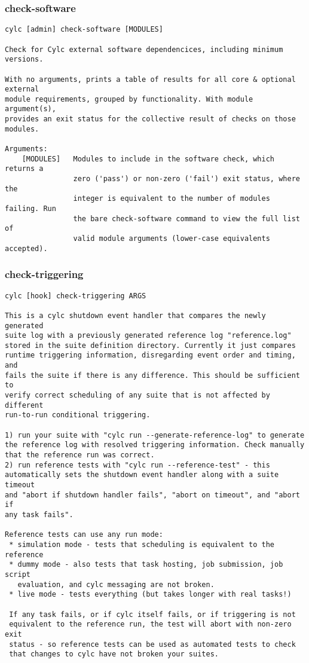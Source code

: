 \subsubsection{check-software}
\label{check-software}
\begin{lstlisting}
cylc [admin] check-software [MODULES]

Check for Cylc external software dependencices, including minimum versions.

With no arguments, prints a table of results for all core & optional external
module requirements, grouped by functionality. With module argument(s),
provides an exit status for the collective result of checks on those modules.

Arguments:
    [MODULES]   Modules to include in the software check, which returns a
                zero ('pass') or non-zero ('fail') exit status, where the
                integer is equivalent to the number of modules failing. Run
                the bare check-software command to view the full list of
                valid module arguments (lower-case equivalents accepted).
\end{lstlisting}
\subsubsection{check-triggering}
\label{check-triggering}
\begin{lstlisting}
cylc [hook] check-triggering ARGS

This is a cylc shutdown event handler that compares the newly generated
suite log with a previously generated reference log "reference.log"
stored in the suite definition directory. Currently it just compares
runtime triggering information, disregarding event order and timing, and
fails the suite if there is any difference. This should be sufficient to
verify correct scheduling of any suite that is not affected by different
run-to-run conditional triggering.

1) run your suite with "cylc run --generate-reference-log" to generate
the reference log with resolved triggering information. Check manually
that the reference run was correct.
2) run reference tests with "cylc run --reference-test" - this
automatically sets the shutdown event handler along with a suite timeout
and "abort if shutdown handler fails", "abort on timeout", and "abort if
any task fails".

Reference tests can use any run mode:
 * simulation mode - tests that scheduling is equivalent to the reference
 * dummy mode - also tests that task hosting, job submission, job script
   evaluation, and cylc messaging are not broken.
 * live mode - tests everything (but takes longer with real tasks!)

 If any task fails, or if cylc itself fails, or if triggering is not
 equivalent to the reference run, the test will abort with non-zero exit
 status - so reference tests can be used as automated tests to check
 that changes to cylc have not broken your suites.
\end{lstlisting}
